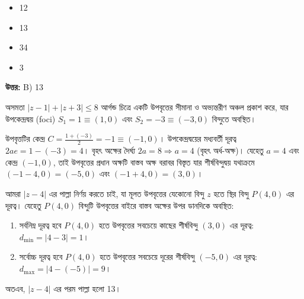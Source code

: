 \documentclass[12pt, a4paper]{article}
\begin{document}
\begin{itemize}[label={}, leftmargin=1cm, itemsep=0.5em]
    \item[\textbf{A)}] 12
    \item[\textbf{B)}] 13
    \item[\textbf{C)}] 34
    \item[\textbf{D)}] 3
\end{itemize}

\vspace{0.5em}
\begin{tcolorbox}[answerbox]
    \textbf{\color{success} উত্তর:} B) 13
\end{tcolorbox}
\vspace{1em}

\begin{tcolorbox}[solutionbox={সমাধান (Solution)}]
    \noindent
    অসমতা $|z - 1| + |z + 3| \leq 8$ আর্গন্ড চিত্রে একটি উপবৃত্তের সীমানা ও অভ্যন্তরীণ অঞ্চল প্রকাশ করে, যার উপকেন্দ্রদ্বয় (foci) $S_1 = 1 \equiv (1, 0)$ এবং $S_2 = -3 \equiv (-3, 0)$ বিন্দুতে অবস্থিত। 
    
    উপবৃত্তটির কেন্দ্র $C = \frac{1 + (-3)}{2} = -1 \equiv (-1, 0)$। উপকেন্দ্রদ্বয়ের মধ্যবর্তী দূরত্ব $2ae = 1 - (-3) = 4$। বৃহৎ অক্ষের দৈর্ঘ্য $2a = 8 \Rightarrow a = 4$ (বৃহৎ অর্ধ-অক্ষ)। যেহেতু $a = 4$ এবং কেন্দ্র $(-1, 0)$, তাই উপবৃত্তের প্রধান অক্ষটি বাস্তব অক্ষ বরাবর বিস্তৃত যার শীর্ষবিন্দুদ্বয় যথাক্রমে $(-1-4, 0) = (-5, 0)$ এবং $(-1+4, 0) = (3, 0)$। 
    
    আমরা $|z - 4|$ এর পাল্লা নির্ণয় করতে চাই, যা মূলত উপবৃত্তের যেকোনো বিন্দু $z$ হতে স্থির বিন্দু $P(4, 0)$ এর দূরত্ব। যেহেতু $P(4, 0)$ বিন্দুটি উপবৃত্তের বাইরে বাস্তব অক্ষের উপর ডানদিকে অবস্থিত:
    \begin{enumerate}
        \item সর্বনিম্ন দূরত্ব হবে $P(4, 0)$ হতে উপবৃত্তের সবচেয়ে কাছের শীর্ষবিন্দু $(3, 0)$ এর দূরত্ব: $d_{\text{min}} = |4 - 3| = 1$।
        \item সর্বোচ্চ দূরত্ব হবে $P(4, 0)$ হতে উপবৃত্তের সবচেয়ে দূরের শীর্ষবিন্দু $(-5, 0)$ এর দূরত্ব: $d_{\text{max}} = |4 - (-5)| = 9$।
    \end{enumerate}
    অতএব, $|z - 4|$ এর পরম পাল্লা হলো 13।
\end{tcolorbox}
\end{document}
